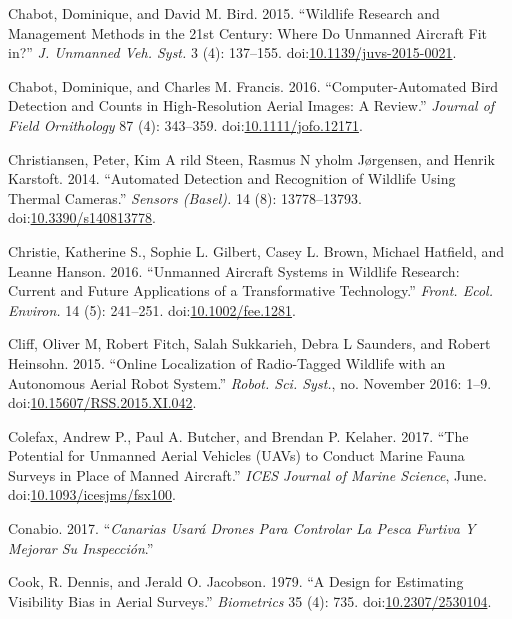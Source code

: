 \documentclass[]{interact}
\theoremstyle{plain}%
\theoremstyle{definition}
\theoremstyle{remark}
\begin{document}
\hypertarget{ref-chabot_wildlife_2015}{}
Chabot, Dominique, and David M. Bird. 2015. ``Wildlife Research and
Management Methods in the 21st Century: Where Do Unmanned Aircraft Fit
in?'' \emph{J. Unmanned Veh. Syst.} 3 (4): 137--155.
doi:\href{https://doi.org/10.1139/juvs-2015-0021}{10.1139/juvs-2015-0021}.

\hypertarget{ref-chabot_computer-automated_2016}{}
Chabot, Dominique, and Charles M. Francis. 2016. ``Computer-Automated
Bird Detection and Counts in High-Resolution Aerial Images: A Review.''
\emph{Journal of Field Ornithology} 87 (4): 343--359.
doi:\href{https://doi.org/10.1111/jofo.12171}{10.1111/jofo.12171}.

\hypertarget{ref-christiansen_automated_2014}{}
Christiansen, Peter, Kim A rild Steen, Rasmus N yholm Jørgensen, and
Henrik Karstoft. 2014. ``Automated Detection and Recognition of Wildlife
Using Thermal Cameras.'' \emph{Sensors (Basel).} 14 (8): 13778--13793.
doi:\href{https://doi.org/10.3390/s140813778}{10.3390/s140813778}.

\hypertarget{ref-christie_unmanned_2016}{}
Christie, Katherine S., Sophie L. Gilbert, Casey L. Brown, Michael
Hatfield, and Leanne Hanson. 2016. ``Unmanned Aircraft Systems in
Wildlife Research: Current and Future Applications of a Transformative
Technology.'' \emph{Front. Ecol. Environ.} 14 (5): 241--251.
doi:\href{https://doi.org/10.1002/fee.1281}{10.1002/fee.1281}.

\hypertarget{ref-cliff_online_2015}{}
Cliff, Oliver M, Robert Fitch, Salah Sukkarieh, Debra L Saunders, and
Robert Heinsohn. 2015. ``Online Localization of Radio-Tagged Wildlife
with an Autonomous Aerial Robot System.'' \emph{Robot. Sci. Syst.}, no.
November 2016: 1--9.
doi:\href{https://doi.org/10.15607/RSS.2015.XI.042}{10.15607/RSS.2015.XI.042}.

\hypertarget{ref-colefax_potential_2017}{}
Colefax, Andrew P., Paul A. Butcher, and Brendan P. Kelaher. 2017. ``The
Potential for Unmanned Aerial Vehicles (UAVs) to Conduct Marine Fauna
Surveys in Place of Manned Aircraft.'' \emph{ICES Journal of Marine
Science}, June.
doi:\href{https://doi.org/10.1093/icesjms/fsx100}{10.1093/icesjms/fsx100}.

\hypertarget{ref-Conabio2017}{}
Conabio. 2017. ``\emph{Canarias Usará Drones Para Controlar La Pesca
Furtiva Y Mejorar Su Inspección}.''

\hypertarget{ref-cook_design_1979}{}
Cook, R. Dennis, and Jerald O. Jacobson. 1979. ``A Design for Estimating
Visibility Bias in Aerial Surveys.'' \emph{Biometrics} 35 (4): 735.
doi:\href{https://doi.org/10.2307/2530104}{10.2307/2530104}.
\end{document}
